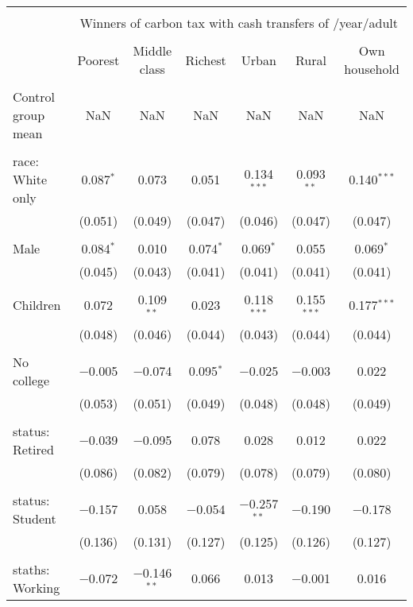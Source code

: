
\begin{tabular}{@{\extracolsep{5pt}}lcccccc} 
\\[-1.8ex]\hline 
\hline \\[-1.8ex] 
 & \multicolumn{6}{c}{Winners of carbon tax with cash transfers of \textdollar 600/year/adult} \\ 
\cline{2-7} 
\\[-1.8ex] & Poorest & Middle class & Richest & Urban & Rural & Own household \\ 
\hline \\[-1.8ex] 
 Control group mean & NaN & NaN & NaN & NaN & NaN & NaN  \\ \hline \\[-1.8ex] race: White only & 0.087$^{*}$ & 0.073 & 0.051 & 0.134$^{***}$ & 0.093$^{**}$ & 0.140$^{***}$ \\ 
  & (0.051) & (0.049) & (0.047) & (0.046) & (0.047) & (0.047) \\ 
  & & & & & & \\ 
 Male & 0.084$^{*}$ & 0.010 & 0.074$^{*}$ & 0.069$^{*}$ & 0.055 & 0.069$^{*}$ \\ 
  & (0.045) & (0.043) & (0.041) & (0.041) & (0.041) & (0.041) \\ 
  & & & & & & \\ 
 Children & 0.072 & 0.109$^{**}$ & 0.023 & 0.118$^{***}$ & 0.155$^{***}$ & 0.177$^{***}$ \\ 
  & (0.048) & (0.046) & (0.044) & (0.043) & (0.044) & (0.044) \\ 
  & & & & & & \\ 
 No college & $-$0.005 & $-$0.074 & 0.095$^{*}$ & $-$0.025 & $-$0.003 & 0.022 \\ 
  & (0.053) & (0.051) & (0.049) & (0.048) & (0.048) & (0.049) \\ 
  & & & & & & \\ 
 status: Retired & $-$0.039 & $-$0.095 & 0.078 & 0.028 & 0.012 & 0.022 \\ 
  & (0.086) & (0.082) & (0.079) & (0.078) & (0.079) & (0.080) \\ 
  & & & & & & \\ 
 status: Student & $-$0.157 & 0.058 & $-$0.054 & $-$0.257$^{**}$ & $-$0.190 & $-$0.178 \\ 
  & (0.136) & (0.131) & (0.127) & (0.125) & (0.126) & (0.127) \\ 
  & & & & & & \\ 
 staths: Working & $-$0.072 & $-$0.146$^{**}$ & 0.066 & 0.013 & $-$0.001 & 0.016 \\ 

\end{tabular}
